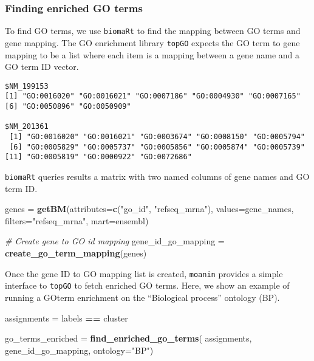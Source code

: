 \documentclass[9pt,a4paper,]{extarticle}
\newenvironment{Shaded}{\begin{snugshade}}{\end{snugshade}}
\newcommand{\CommentTok}[1]{\textcolor[rgb]{0.56,0.35,0.01}{\textit{#1}}}
\newcommand{\DataTypeTok}[1]{\textcolor[rgb]{0.13,0.29,0.53}{#1}}
\newcommand{\KeywordTok}[1]{\textcolor[rgb]{0.13,0.29,0.53}{\textbf{#1}}}
\newcommand{\NormalTok}[1]{#1}
\newcommand{\OperatorTok}[1]{\textcolor[rgb]{0.81,0.36,0.00}{\textbf{#1}}}
\newcommand{\StringTok}[1]{\textcolor[rgb]{0.31,0.60,0.02}{#1}}
\begin{document}
\hypertarget{finding-enriched-go-terms}{%
\subsubsection{Finding enriched GO terms}\label{finding-enriched-go-terms}}

To find GO terms, we use \texttt{biomaRt} to find the mapping between GO terms and
gene mapping. The GO enrichment library \texttt{topGO} \citep{alexa:topgo} expects the GO term to gene
mapping to be a list where each item is a mapping between a gene name and a GO
term ID vector.

\begin{verbatim}
$NM_199153
[1] "GO:0016020" "GO:0016021" "GO:0007186" "GO:0004930" "GO:0007165"
[6] "GO:0050896" "GO:0050909"

$NM_201361
 [1] "GO:0016020" "GO:0016021" "GO:0003674" "GO:0008150" "GO:0005794"
 [6] "GO:0005829" "GO:0005737" "GO:0005856" "GO:0005874" "GO:0005739"
[11] "GO:0005819" "GO:0000922" "GO:0072686"
\end{verbatim}

\texttt{biomaRt} queries results a matrix with two named columns of gene names and GO
term ID.

\begin{Shaded}
\begin{Highlighting}[]
\NormalTok{genes =}\StringTok{ }\KeywordTok{getBM}\NormalTok{(}\DataTypeTok{attributes=}\KeywordTok{c}\NormalTok{(}\StringTok{"go_id"}\NormalTok{, }\StringTok{"refseq_mrna"}\NormalTok{),}
          \DataTypeTok{values=}\NormalTok{gene_names,}
          \DataTypeTok{filters=}\StringTok{"refseq_mrna"}\NormalTok{,}
          \DataTypeTok{mart=}\NormalTok{ensembl)}

\CommentTok{# Create gene to GO id mapping}
\NormalTok{gene_id_go_mapping =}\StringTok{ }\KeywordTok{create_go_term_mapping}\NormalTok{(genes)}
\end{Highlighting}
\end{Shaded}

Once the gene ID to GO mapping list is created, \texttt{moanin} provides a simple
interface to \texttt{topGO} to fetch enriched GO terms. Here, we show an example of
running a GOterm enrichment on the ``Biological process'' ontology (BP).

\begin{Shaded}
\begin{Highlighting}[]
\NormalTok{assignments =}\StringTok{ }\NormalTok{labels }\OperatorTok{==}\StringTok{ }\NormalTok{cluster}

\NormalTok{go_terms_enriched =}\StringTok{ }\KeywordTok{find_enriched_go_terms}\NormalTok{(}
\NormalTok{    assignments,}
\NormalTok{    gene_id_go_mapping, }\DataTypeTok{ontology=}\StringTok{"BP"}\NormalTok{)}
\end{Highlighting}
\end{Shaded}
\end{document}
